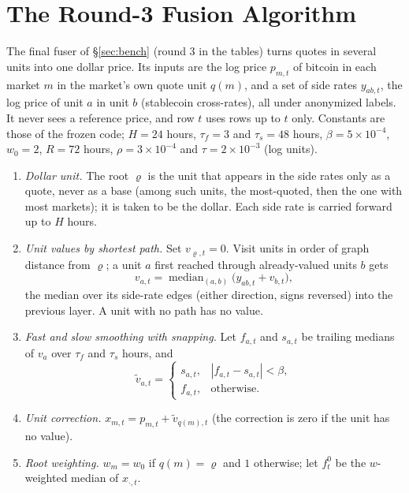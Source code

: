 \documentclass[sigconf,review,anonymous]{acmart}
\begin{document}
\section{The Round-3 Fusion Algorithm}
\label{sec:fuser}
The final fuser of \S\ref{sec:bench} (round 3 in the tables) turns quotes in several units into one dollar price. Its
inputs are the log price $p_{m,t}$ of bitcoin in each market $m$ in the market's own quote unit $q(m)$, and a set of side
rates $y_{ab,t}$, the log price of unit $a$ in unit $b$ (stablecoin cross-rates), all under anonymized labels. It never sees
a reference price, and row $t$ uses rows up to $t$ only. Constants are those of the frozen code; $H=24$ hours, $\tau_f=3$ and $\tau_s=48$ hours,
$\beta=5\times10^{-4}$, $w_0=2$, $R=72$ hours, $\rho=3\times10^{-4}$ and $\tau=2\times10^{-3}$ (log units).
\begin{enumerate}
\item \emph{Dollar unit.} The root $\varrho$ is the unit that appears in the side rates only as a quote, never as a base (among such units, the most-quoted, then the one with most markets); it is taken to be the dollar. Each side rate is carried forward up to $H$ hours.
\item \emph{Unit values by shortest path.} Set $v_{\varrho,t}=0$. Visit units in order of graph distance from $\varrho$; a unit $a$ first
reached through already-valued units $b$ gets
\begin{equation}
v_{a,t}=\operatorname{median}_{(a,b)}\big(y_{ab,t}+v_{b,t}\big),
\label{eq:unitval}
\end{equation}
the median over its side-rate edges (either direction, signs reversed) into the previous layer. A unit with no path has no value.
\item \emph{Fast and slow smoothing with snapping.} Let $f_{a,t}$ and $s_{a,t}$ be trailing medians of $v_a$ over $\tau_f$ and $\tau_s$ hours, and
\begin{equation}
\tilde v_{a,t}=\begin{cases} s_{a,t}, & |f_{a,t}-s_{a,t}|<\beta,\\ f_{a,t}, & \text{otherwise.}\end{cases}
\label{eq:snap}
\end{equation}
\item \emph{Unit correction.} $x_{m,t}=p_{m,t}+\tilde v_{q(m),t}$ (the correction is zero if the unit has no value).
\item \emph{Root weighting.} $w_m=w_0$ if $q(m)=\varrho$ and $1$ otherwise; let $f^0_t$ be the $w$-weighted median of $x_{\cdot,t}$.

\end{enumerate}
\end{document}
